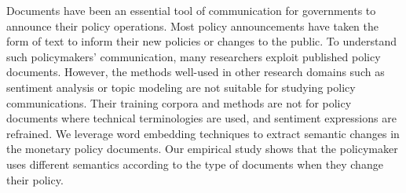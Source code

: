 Documents have been an essential tool of communication for governments to announce their policy operations. Most policy announcements have taken the form of text to inform their new policies or changes to the public. To understand such policymakers' communication, many researchers exploit published policy documents. However, the methods well-used in other research domains such as sentiment analysis or topic modeling are not suitable for studying policy communications. Their training corpora and methods are not for policy documents where technical terminologies are used, and sentiment expressions are refrained. We leverage word embedding techniques to extract semantic changes in the monetary policy documents. Our empirical study shows that the policymaker uses different semantics according to the type of documents when they change their policy.
